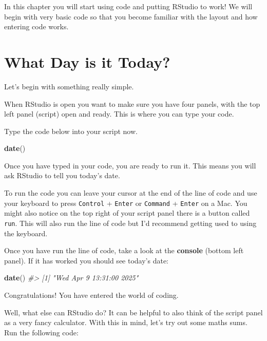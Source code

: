 \documentclass[
]{book}
\newenvironment{Shaded}{\begin{snugshade}}{\end{snugshade}}
\newcommand{\CommentTok}[1]{\textcolor[rgb]{0.56,0.35,0.01}{\textit{#1}}}
\newcommand{\FunctionTok}[1]{\textcolor[rgb]{0.13,0.29,0.53}{\textbf{#1}}}
\newcommand{\NormalTok}[1]{#1}
\let\oldsection\section
\renewcommand{\section}{\needspace{5\baselineskip}\oldsection}
\begin{document}
In this chapter you will start using code and putting RStudio to work! We will begin with very basic code so that you become familiar with the layout and how entering code works.

\section{What Day is it Today?}\label{what-day-is-it-today}

Let's begin with something really simple.

When RStudio is open you want to make sure you have four panels, with the top left panel (script) open and ready. This is where you can type your code.

Type the code below into your script now.

\begin{Shaded}
\begin{Highlighting}[]
\FunctionTok{date}\NormalTok{()}
\end{Highlighting}
\end{Shaded}

Once you have typed in your code, you are ready to run it. This means you will ask RStudio to tell you today's date.

To run the code you can leave your cursor at the end of the line of code and use your keyboard to press \texttt{Control} + \texttt{Enter} or \texttt{Command} + \texttt{Enter} on a Mac. You might also notice on the top right of your script panel there is a button called \texttt{run}. This will also run the line of code but I'd recommend getting used to using the keyboard.

\newpage

Once you have run the line of code, take a look at the \textbf{console} (bottom left panel). If it has worked you should see today's date:

\begin{Shaded}
\begin{Highlighting}[]
\FunctionTok{date}\NormalTok{()}
\CommentTok{\#\textgreater{} [1] "Wed Apr  9 13:31:00 2025"}
\end{Highlighting}
\end{Shaded}

Congratulations! You have entered the world of coding.

Well, what else can RStudio do? It can be helpful to also think of the script panel as a very fancy calculator. With this in mind, let's try out some maths sums. Run the following code:
\end{document}
